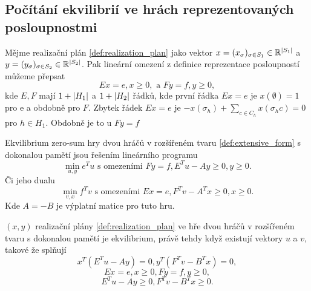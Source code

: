 \subsection{Počítání ekvilibrií ve hrách reprezentovaných posloupnostmi}
\begin{theorem}\label{thm:linear_solution}
    Mějme realizační plán \ref{def:realization_plan} jako vektor $x = (x_\sigma)_{\sigma \in S_1} \in \mathbb{R}^{\left|S_1\right|}$ a $y = (y_\sigma)_{\sigma \in S_2} \in \mathbb{R}^{\left|S_2\right|}$. 
    Pak lineární omezení z definice reprezentace posloupností můžeme přepsat 
    \[
        Ex = e, x\geq 0, \text{ a } Fy = f, y\geq 0,
    \]
    kde $E,F$ mají $1 + \left|H_1\right|$ a $1 + \left|H_2\right|$ řádků, kde první řádka $Ex = e$ je $x(\emptyset) = 1$ pro e a obdobně pro $F$. 
    Zbytek řádek $Ex = e$ je $-x(\sigma_h) + \sum_{c \in C_h} x(\sigma_hc) = 0$ pro $h \in H_1$. 
    Obdobně je to u $Fy = f$

    Ekvilibrium zero-sum hry dvou hráčů v rozšířeném tvaru \ref{def:extensive_form} s dokonalou pamětí jsou řešením lineárního programu 
    \[
        \min_{u,y} e^T u \text{ s omezeními } Fy = f, E^Tu - Ay \geq 0, y \geq 0. 
    \]
    Či jeho dualu 
    \[
        \min_{v,x} f^T v \text{ s omezeními } Ex = e, F^Tv - A^Tx \geq 0, x \geq 0. 
    \]
    Kde $A = -B$ je výplatní matice pro tuto hru. 
\end{theorem}
\begin{theorem}\label{thm:linear_extended}
    $(x,y)$ realizační plány \ref{def:realization_plan} ve hře dvou hráčů v rozšířeném tvaru s dokonalou pamětí je ekvilibrium, právě tehdy když existují vektory $u$ a $v$, takové že splňují 
    \[
        x^T(E^Tu-Ay) = 0, y^T(F^Tv - B^Tx) = 0,
    \]
    \[
        Ex = e, x\geq 0, Fy = f, y \geq 0,
    \]
    \[
        E^Tu -Ay \geq 0, F^Tv -B^Tx \geq 0.
    \]
\end{theorem}
